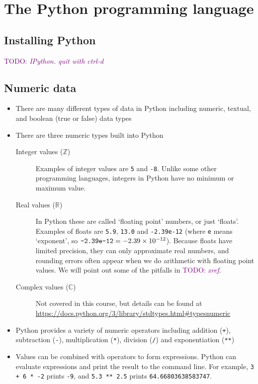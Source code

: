 \documentclass[a4paper,twoside]{memoir}
\newcommand{\shellcmd}{\texttt}
\newcommand{\TODO}[1]{\textcolor{purple}{TODO: \emph{#1}}}
\begin{document}
\chapter{The Python programming language}

\section{Installing Python}

\TODO{IPython.  quit with ctrl-d}

\section{Numeric data}
\begin{itemize}
\item There are many different types of data in Python including numeric, textual, and boolean (true or false) data types
\item There are three numeric types built into Python
	\begin{description}
	\item[Integer values ($\mathbb{Z}$)]{Examples of integer values are \shellcmd{5} and \shellcmd{-8}.  Unlike some other programming languages, integers in Python have no minimum or maximum value.}
	\item[Real values ($\mathbb{R}$)]{In Python these are called `floating point' numbers, or just `floats'.  Examples of floats are \shellcmd{5.9}, \shellcmd{13.0} and \shellcmd{-2.39e-12} (where \shellcmd{e} means `exponent', so $\text{\shellcmd{-2.39e-12}} = \num{-2.39e-12}$).  Because floats have limited precision, they can only approximate real numbers, and rounding errors often appear when we do arithmetic with floating point values.  We will point out some of the pitfalls in \TODO{xref}.}
	\item[Complex values ($\mathbb{C}$)]{Not covered in this course, but details can be found at \url{https://docs.python.org/3/library/stdtypes.html#typesnumeric}}
	\end{description}
\item Python provides a variety of numeric operators including addition (\shellcmd{+}), subtraction (\shellcmd{-}), multiplication (\shellcmd{*}), division (\shellcmd{/}) and exponentiation (\shellcmd{**})
\item Values can be combined with operators to form expressions.  Python can evaluate expressions and print the result to the command line.  For example, \shellcmd{3 + 6 * -2} prints \shellcmd{-9}, and \shellcmd{5.3 ** 2.5} prints \shellcmd{64.66803638583747}.

\end{itemize}
\end{document}
